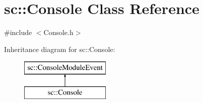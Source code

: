 \hypertarget{classsc_1_1_console}{}\section{sc\+::Console Class Reference}
\label{classsc_1_1_console}


{\ttfamily \#include $<$Console.\+h$>$}

Inheritance diagram for sc\+::Console\+:\begin{figure}[H]
\begin{center}
\leavevmode
\includegraphics[height=2.000000cm]{d4/d8e/classsc_1_1_console}
\end{center}
\end{figure}
